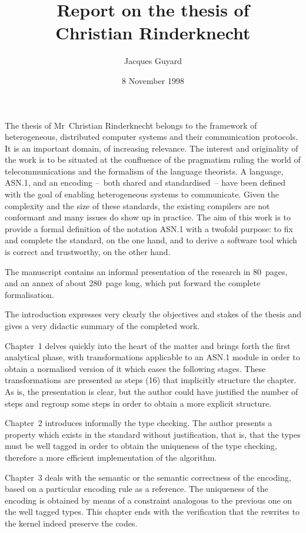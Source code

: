 \documentclass[a4paper,11pt,twoside]{article}
\title{\Huge Report on the thesis of\\ Christian Rinderknecht}
\author{\Large Jacques Guyard}
\date{8 November 1998}
\begin{document}
\maketitle

The thesis of Mr~Christian Rinderknecht belongs to the framework of
heterogeneous, distributed computer systems and their communication
protocols. It is an important domain, of increasing relevance. The
interest and originality of the work is to be situated at the
confluence of the pragmatism ruling the world of telecommunications
and the formalism of the language theorists. A language, ASN.1, and an
encoding --~both shared and standardised~-- have been defined with the
goal of enabling heterogeneous systems to communicate. Given the
complexity and the size of these standards, the existing compilers are
not conformant and many issues do show up in practice. The aim of this
work is to provide a formal definition of the notation ASN.1 with a
twofold purpose: to fix and complete the standard, on the one hand,
and to derive a software tool which is correct and trustworthy, on the
other hand.

The manuscript contains an informal presentation of the research in
80~pages, and an annex of about 280~page long, which put forward the
complete formalisation.

The introduction expresses very clearly the objectives and stakes of
the thesis and gives a very didactic summary of the completed work.

Chapter~1 delves quickly into the heart of the matter and brings forth
the first analytical phase, with transformations applicable to an
ASN.1 module in order to obtain a normalised version of it which eases
the following stages. These transformations are presented as steps
(16) that implicitly structure the chapter. As is, the presentation is
clear, but the author could have justified the number of steps and
regroup some steps in order to obtain a more explicit structure.

Chapter~2 introduces informally the type checking. The author
pre\-sents a property which exists in the standard without
justification, that is, that the types must be well tagged in order to
obtain the uniqueness of the type checking, therefore a more efficient
implementation of the algorithm.

Chapter~3 deals with the semantic or the semantic correctness of the
encoding, based on a particular encoding rule as a reference. The
uniqueness of the encoding is obtained by means of a constraint
analogous to the previous one on the well tagged types. This chapter
ends with the verification that the rewrites to the kernel indeed
preserve the codes.
\end{document}
